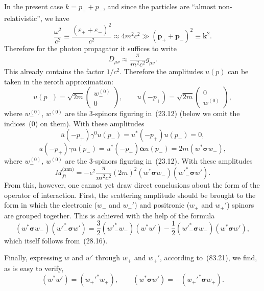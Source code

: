 In the present case $k = p_+ + p_-$, and since the particles are ``almost non-relativistic'', we have
\[
\frac{\omega^2}{c^2} \equiv \frac{(\varepsilon_+ + \varepsilon_-)^2}{c^2} \approx 4m^2c^2 \gg (\mathbf{p}_+ + \mathbf{p}_-)^2 \equiv \mathbf{k}^2.
\]
Therefore for the photon propagator it suffices to write
\[
D_{\mu\nu} \approx \frac{\pi}{m^2c^2}g_{\mu\nu}.
\]
This already contains the factor $1/c^2$. Therefore the amplitudes $u(p)$ can be taken in the zeroth approximation:
\[
u(p_-) = \sqrt{2m}\begin{pmatrix}w_-^{(0)}\\0\end{pmatrix},\qquad u(-p_+) = \sqrt{2m}\begin{pmatrix}0\\w^{(0)}\end{pmatrix},
\]
where $w_-^{(0)}$, $w^{(0)}$ are the 3-spinors figuring in~(23.12) (below we omit the indices~(0) on them). With these amplitudes
\[
\bar{u}(-p_+)\gamma^0 u(p_-) = u^*(-p_+) u(p_-) = 0,
\]
\[
\bar{u}(-p_+)\gamma u(p_-) = u^*(-p_+)\boldsymbol{\alpha}u(p_-) = 2m(w^*\boldsymbol{\sigma}w_-),
\]
where $w_-^{(0)}$, $w^{(0)}$ are the 3-spinors figuring in~(23.12). With these amplitudes
\begin{equation}
M_{fi}^\text{(ann)} = -e^2\frac{\pi}{m^2c^2}(2m)^2(w^*\boldsymbol{\sigma}w_-)(w'^{*}_-\boldsymbol{\sigma}w').
\tag{83.20}
\end{equation}
From this, however, one cannot yet draw direct conclusions about the form of the operator of interaction. First, the scattering amplitude should be brought to the form in which the electronic ($w_-$ and $w_-'$) and positronic ($w_+$ and $w_+'$) spinors are grouped together. This is achieved with the help of the formula
\begin{equation}
(w^*\boldsymbol{\sigma}w_-)(w'^{*}_-\boldsymbol{\sigma}w') = \frac{3}{2}(w'^*_-w_-)(w^*w') - \frac{1}{2}(w'^*_-\boldsymbol{\sigma}w_-)(w^*\boldsymbol{\sigma}w'),
\tag{83.22}
\end{equation}
which itself follows from~(28.16).

Finally, expressing $w$ and $w'$ through $w_+$ and $w_+'$, according to~(83.21), we find, as is easy to verify,
\begin{equation}
(w^*w') = (w_+'^*w_+),\qquad (w^*\boldsymbol{\sigma}w') = -(w_+'^*\boldsymbol{\sigma}w_+).
\tag{83.23}
\end{equation}

